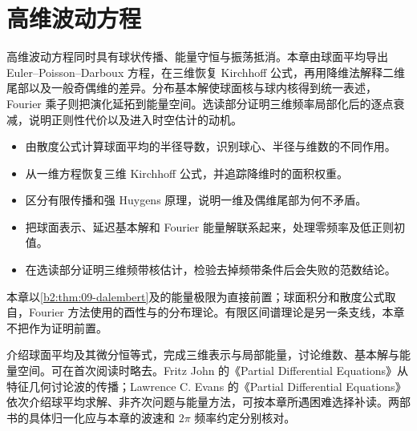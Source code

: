 \chapter{高维波动方程}
\label{b2:ch:11}
\begin{chapterabstract}
高维波动方程同时具有球状传播、能量守恒与振荡抵消。本章由球面平均导出 Euler--Poisson--Darboux 方程，在三维恢复 Kirchhoff 公式，再用降维法解释二维尾部以及一般奇偶维的差异。分布基本解使球面核与球内核得到统一表述，Fourier 乘子则把演化延拓到能量空间。选读部分证明三维频率局部化后的逐点衰减，说明正则性代价以及进入时空估计的动机。
\end{chapterabstract}
\begin{learninggoals}
\begin{itemize}
\item\label{b2:item:11-goal-mean}由散度公式计算球面平均的半径导数，识别球心、半径与维数的不同作用。
\item\label{b2:item:11-goal-representation}从一维方程恢复三维 Kirchhoff 公式，并追踪降维时的面积权重。
\item\label{b2:item:11-goal-support}区分有限传播和强 Huygens 原理，说明一维及偶维尾部为何不矛盾。
\item\label{b2:item:11-goal-energy}把球面表示、延迟基本解和 Fourier 能量解联系起来，处理零频率及低正则初值。
\item\label{b2:item:11-goal-dispersion}在选读部分证明三维频带核估计，检验去掉频带条件后会失败的范数结论。
\end{itemize}
\end{learninggoals}

本章以\cref{b2:thm:09-dalembert}及的能量极限为直接前置；球面积分和散度公式取自，Fourier 方法使用的酉性与的分布理论。有限区间谱理论是另一条支线，本章不把作为证明前置。

\ProseParagraphBreak

介绍球面平均及其微分恒等式，完成三维表示与局部能量，讨论维数、基本解与能量空间。可在首次阅读时略去。Fritz John 的《Partial Differential Equations》\cite{John1991Partial}从特征几何讨论波的传播；Lawrence C. Evans 的《Partial Differential Equations》\cite[Sections 2.4.1--2.4.3]{Evans2010Partial}依次介绍球平均求解、非齐次问题与能量方法，可按本章所遇困难选择补读。两部书的具体归一化应与本章的波速和 \(2\pi\) 频率约定分别核对。

